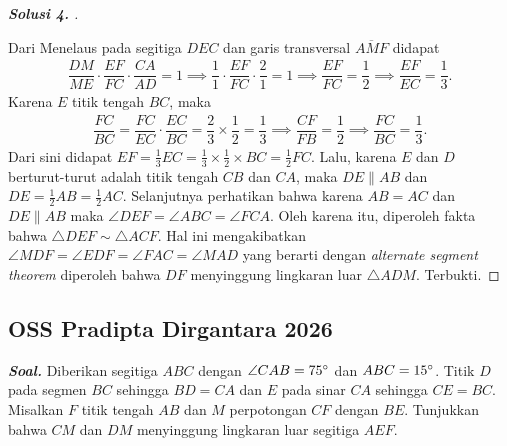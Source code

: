 \documentclass[letterpaper, 13pt]{scrartcl}
\begin{document}
\begin{proof}[\textbf{Solusi 4. }]
\begin{center}
\end{center}

    Dari Menelaus pada segitiga $DEC$ dan garis transversal $\overline{AMF}$ didapat
    \begin{align*}
        \dfrac{DM}{ME}\cdot \dfrac{EF}{FC} \cdot \dfrac{CA}{AD} = 1 \implies
        \dfrac{1}{1}\cdot \dfrac{EF}{FC} \cdot \dfrac{2}{1} = 1 \implies
        \dfrac{EF}{FC} = \dfrac{1}{2} \implies
        \dfrac{EF}{EC} = \dfrac{1}{3}.
    \end{align*}
    Karena $E$ titik tengah $BC$, maka 
    \begin{align*}
        \dfrac{FC}{BC} = \dfrac{FC}{EC} \cdot \dfrac{EC}{BC} = \dfrac{2}{3} \times \dfrac{1}{2} = \dfrac{1}{3} \implies 
        \dfrac{CF}{FB} = \dfrac{1}{2} \implies
        \dfrac{FC}{BC} = \dfrac{1}{3}.
    \end{align*}
    Dari sini didapat $EF = \frac{1}{3}EC = \frac{1}{3}\times\frac{1}{2}\times BC = \frac{1}{2} FC$.
    Lalu, karena $E$ dan $D$ berturut-turut adalah titik tengah $CB$ dan $CA$, maka $DE \parallel AB$ dan $DE= \frac{1}{2}AB = \frac{1}{2}AC$. 
    Selanjutnya perhatikan bahwa karena $AB=AC$ dan $DE \parallel AB$ maka $\angle DEF = \angle ABC = \angle FCA$. 
    Oleh karena itu, diperoleh fakta bahwa $\triangle DEF \sim \triangle ACF$. 
    Hal ini mengakibatkan $\angle MDF = \angle EDF = \angle FAC = \angle MAD$ yang berarti dengan \textit{alternate segment theorem} diperoleh bahwa $DF$ menyinggung lingkaran luar $\triangle ADM$.
    Terbukti.

\end{proof}

\subsection{OSS Pradipta Dirgantara 2026}

\textbf{\textit{Soal. }}Diberikan segitiga $ABC$ dengan $\angle CAB = 75^\circ$ dan $ABC=15^\circ$. Titik $D$ pada segmen $BC$ sehingga $BD=CA$ dan $E$ pada sinar $CA$ sehingga $CE=BC$. Misalkan $F$ titik tengah $AB$ dan $M$ perpotongan $CF$ dengan $BE$. Tunjukkan bahwa $CM$ dan $DM$ menyinggung lingkaran luar segitiga $AEF$.
\end{document}
